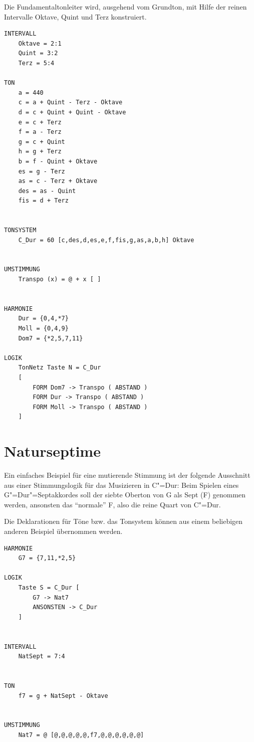 Die Fundamentaltonleiter wird, ausgehend vom Grundton, mit Hilfe 
der reinen Intervalle Oktave, Quint und Terz konstruiert.


\begin{verbatim}
INTERVALL  
    Oktave = 2:1
    Quint = 3:2 
    Terz = 5:4

TON
    a = 440 
    c = a + Quint - Terz - Oktave 
    d = c + Quint + Quint - Oktave 
    e = c + Terz  
    f = a - Terz 
    g = c + Quint 
    h = g + Terz  
    b = f - Quint + Oktave 
    es = g - Terz 
    as = c - Terz + Oktave 
    des = as - Quint 
    fis = d + Terz 


TONSYSTEM  
    C_Dur = 60 [c,des,d,es,e,f,fis,g,as,a,b,h] Oktave


UMSTIMMUNG 
    Transpo (x) = @ + x [ ]


HARMONIE 
    Dur = {0,4,*7}
    Moll = {0,4,9} 
    Dom7 = {*2,5,7,11}

LOGIK 
    TonNetz Taste N = C_Dur
    [ 
        FORM Dom7 -> Transpo ( ABSTAND ) 
        FORM Dur -> Transpo ( ABSTAND )  
        FORM Moll -> Transpo ( ABSTAND )  
    ]
\end{verbatim}


\section{Naturseptime}
\label{sec:EX_NATSEVEN}

Ein einfaches Beispiel für eine mutierende Stimmung ist der 
folgende Ausschnitt aus einer Stimmungslogik für das Musizieren 
in C"=Dur: Beim Spielen eines G"=Dur"=Septakkordes soll der siebte 
Oberton von G als Sept (F) genommen werden, ansonsten das "`normale"'
F, also die reine Quart von C"=Dur. 

Die Deklarationen für Töne bzw. das Tonsystem  können 
aus einem beliebigen anderen Beispiel übernommen werden.


\begin{verbatim}
HARMONIE 
    G7 = {7,11,*2,5}

LOGIK 
    Taste S = C_Dur [
        G7 -> Nat7 
        ANSONSTEN -> C_Dur 
    ]


INTERVALL 
    NatSept = 7:4


TON
    f7 = g + NatSept - Oktave


UMSTIMMUNG 
    Nat7 = @ [@,@,@,@,@,f7,@,@,@,@,@,@]
\end{verbatim}

